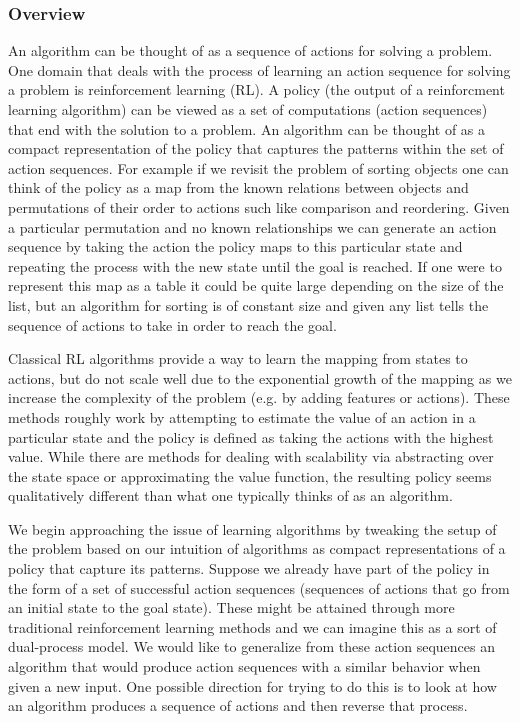\documentclass[a4paper,12pt]{article}
\begin{document}
\subsubsection{Overview}
An algorithm can be thought of as a sequence of actions for solving a problem.  One domain that deals with the process of learning an action sequence for solving a problem is reinforcement learning (RL).  A policy (the output of a reinforcment learning algorithm) can be viewed as a set of computations (action sequences)
that end with the solution to a problem.  An algorithm can be thought
of as a compact representation of the policy that captures the patterns within the set of action sequences.  For example if we revisit the problem of sorting objects one can think of the policy as a map from the known relations between objects and permutations of their order to actions such like comparison and reordering.  Given a particular permutation and no known relationships we can generate an action sequence by taking the action the policy maps to this particular state  and repeating the process with the new state until the goal is reached.   If one were to represent this map as a table it could be quite large depending on the size of the list, but an algorithm for sorting is of constant size and given any list tells the sequence of actions to take in order to reach the goal.

Classical RL algorithms provide a way to learn the mapping from states to actions, but do not scale well due to the exponential growth of the mapping as we increase the complexity of the problem (e.g. by adding features or actions).  These methods roughly work by attempting to estimate the value of an action in a particular state and the policy is defined as taking the actions with the highest value.  While there are methods for dealing with scalability via abstracting over the state space or approximating the value function, the resulting policy seems qualitatively different than what one typically thinks of as an algorithm.

We begin approaching the issue of learning algorithms by tweaking the setup of the problem based on our intuition of algorithms as compact representations of a policy that capture its patterns.  Suppose we already have part of the policy in the form of a set of successful action sequences (sequences of actions that go from an initial state to the goal state).  These might be attained through more traditional reinforcement learning methods and we can imagine this as a sort of dual-process model.  We would like to generalize from these action sequences an algorithm that would produce action sequences with a similar behavior when given a new input.  One possible direction for trying to do this is to look at how an algorithm produces a sequence of actions and then reverse that process.  
\end{document}
